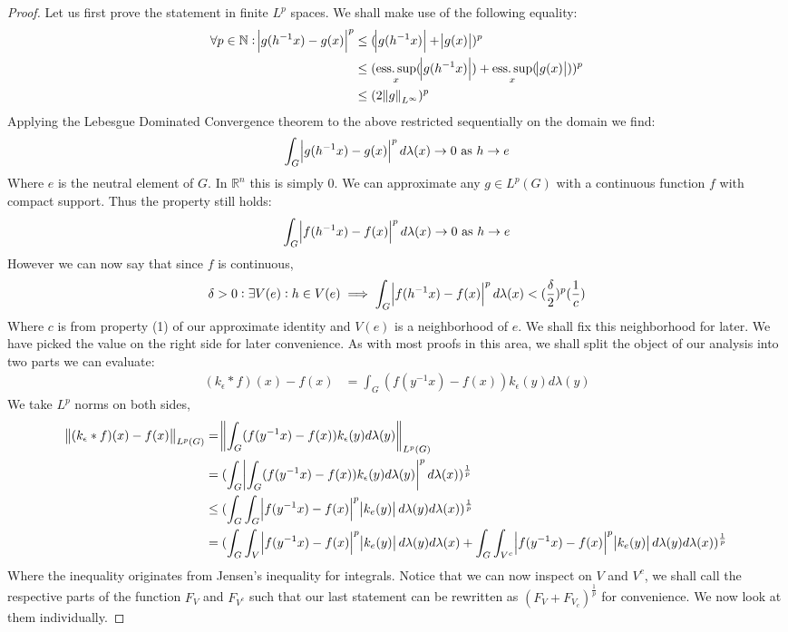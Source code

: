 \begin{proof}
Let us first prove the statement in finite $L^p$ spaces. We shall make use of the following equality:
\begin{align*}
\forall p \in \mathbb{N} : \abs{g(h^{-1}x) - g(x)}^p &\leq (\abs{g(h^{-1}x)}+\abs{g(x)})^p \\
&\leq (\esssup_x (\abs{g(h^{-1}x)} )+\esssup_x(\abs{g(x)}) )^p \\
&\leq (2\norm{g}_{L^\infty})^p
\end{align*}
Applying the Lebesgue Dominated Convergence theorem to the above restricted sequentially on the domain we find:
\begin{align*}
\int_G \abs{g(h^{-1}x)-g(x)}^p d\lambda(x) \to 0 \text{ as } h \to e
\end{align*}
Where $e$ is the neutral element of $G$. In $\mathbb{R}^n$ this is simply $0$. We can approximate any $g \in L^p(G)$ with a continuous function $f$ with compact support. Thus the property still holds:
\begin{align*}
\int_G \abs{f(h^{-1}x)-f(x)}^p d\lambda(x) \to 0 \text{ as } h \to e
\end{align*}
However we can now say that since $f$ is continuous,
\begin{equation}
\delta > 0 : \exists V(e): h \in V(e) \implies \int_G \abs{f(h^{-1}x) - f(x)}^p d\lambda(x) < (\frac{\delta}{2})^p ( \frac{1}{c})
\end{equation}
Where $c$ is from property (1) of our approximate identity and $V(e)$ is a neighborhood of $e$. We shall fix this neighborhood for later. We have picked the value on the right side for later convenience. As with most proofs in this area, we shall split the object of our analysis into two parts we can evaluate:
\begin{align*}
(k_\epsilon \ast f)(x) - f(x) &= \int_G (f(y^{-1}x)-f(x))k_\epsilon(y) d\lambda(y)
\end{align*}
We take $L^p$ norms on both sides, 
\begin{align*}
\norm{(k_\epsilon \ast f)(x) - f(x)}_{L^p(G)} &= \norm{\int_G (f(y^{-1}x)-f(x))k_\epsilon(y) d\lambda(y)}_{L^p(G)} \\
&= (\int_G \abs{\int_G (f(y^{-1}x)-f(x))k_\epsilon(y) d\lambda(y)}^p d\lambda(x) )^{\frac{1}{p}}\\
&\leq (\int_G \int_G \abs{f(y^{-1}x)-f(x)}^p \abs{k_e(y)}  d\lambda(y) d\lambda(x) )^{\frac{1}{p}} \\
&= (\int_G \int_V \abs{f(y^{-1}x)-f(x)}^p \abs{k_e(y)} d\lambda(y) d\lambda(x) 
+ \int_G \int_{V^c} \abs{f(y^{-1}x)-f(x)}^p \abs{k_e(y)} d\lambda(y) d\lambda(x) )^{\frac{1}{p}}
\end{align*}
Where the inequality originates from Jensen's inequality for integrals. Notice that we can now inspect on $V$ and $V^c$, we shall call the respective parts of the function $F_V$ and $F_{V^c}$ such that our last statement can be rewritten as $ ( F_V + F_{V_c} )^{\frac{1}{p}}$ for convenience. We now look at them individually. 


\end{proof}
